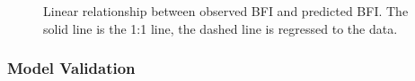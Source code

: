 \documentclass[
]{agujournal2019}
\begin{document}
\begin{figure}


\caption{\label{fig-actual_predicted}Linear relationship between
observed BFI and predicted BFI. The solid line is the 1:1 line, the
dashed line is regressed to the data.}

\end{figure}%

\subsubsection{Model Validation}\label{model-validation}
\end{document}
